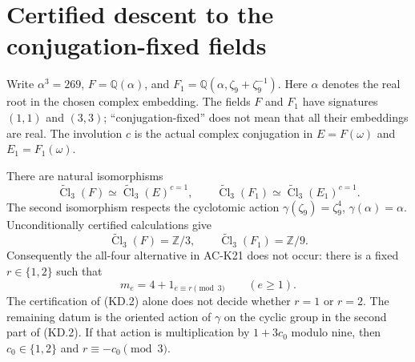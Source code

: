 \section{Certified descent to the conjugation-fixed fields}
\label{sec:cubic-real-descent}

Write $\alpha^3=269$, $F=\mathbb Q(\alpha)$, and
$F_1=\mathbb Q(\alpha,\zeta_9+\zeta_9^{-1})$.
Here $\alpha$ denotes the real root in the chosen complex embedding.
The fields $F$ and $F_1$ have signatures $(1,1)$ and $(3,3)$;
``conjugation-fixed'' does not mean that all their embeddings are real.
The involution $c$ is the actual complex conjugation in
$E=F(\omega)$ and $E_1=F_1(\omega)$.

\begin{proposition}
\label{AC-K22}
There are natural isomorphisms
\[
 \widetilde{\operatorname{Cl}}_3(F)
       \simeq\widetilde{\operatorname{Cl}}_3(E)^{c=1},\qquad
 \widetilde{\operatorname{Cl}}_3(F_1)
       \simeq\widetilde{\operatorname{Cl}}_3(E_1)^{c=1}.
                                                        \tag{KD.1}
\]
The second isomorphism respects the cyclotomic action
$\gamma(\zeta_9)=\zeta_9^4$, $\gamma(\alpha)=\alpha$.
Unconditionally certified calculations give
\[
 \widetilde{\operatorname{Cl}}_3(F)=\mathbb Z/3,
 \qquad
 \widetilde{\operatorname{Cl}}_3(F_1)=\mathbb Z/9.
                                                        \tag{KD.2}
\]
Consequently the all-four alternative in AC-K21 does not occur:
there is a fixed $r\in\{1,2\}$ such that
\[
                m_e=4+1_{e\equiv r\pmod3}
                   \qquad(e\geq1).                    \tag{KD.3}
\]
The certification of (KD.2) alone does not decide whether $r=1$
or $r=2$.  The remaining datum is the oriented action of
$\gamma$ on the cyclic group in the second part of (KD.2).
If that action is multiplication by $1+3c_0$ modulo nine,
then $c_0\in\{1,2\}$ and $r\equiv-c_0\pmod3$.
\end{proposition}
